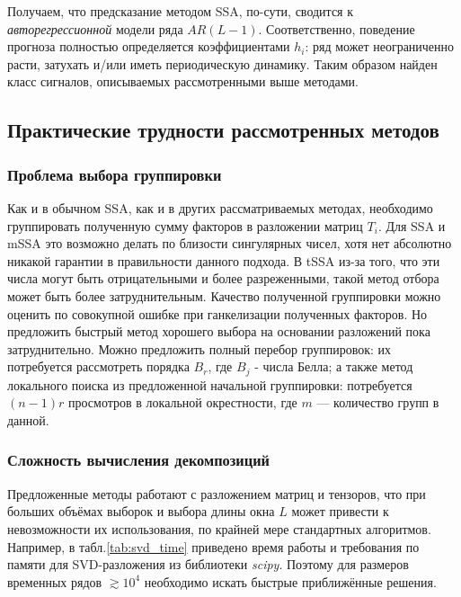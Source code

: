 			 Получаем, что предсказание методом SSA, по-сути, сводится к \textit{авторегрессионной} модели ряда $ AR(L - 1) $. Соответственно, поведение прогноза полностью определяется коэффициентами $ h_i $: ряд может неограниченно расти, затухать и/или иметь периодическую динамику. Таким образом найден класс сигналов, описываемых рассмотренными выше методами.
			 
			 
			 \subsection*{Практические трудности рассмотренных методов}
			 	
			 	\subsubsection*{Проблема выбора группировки}
			 	
			 		Как и в обычном SSA, как и в других рассматриваемых методах, необходимо группировать полученную сумму факторов в разложении матриц $ T_i $. Для SSA и mSSA это возможно делать по близости сингулярных чисел, хотя нет абсолютно никакой гарантии в правильности данного подхода. В tSSA из-за того, что эти числа могут быть отрицательными и более разреженными, такой метод отбора может быть более затруднительным. Качество полученной группировки можно оценить по совокупной ошибке при ганкелизации полученных факторов. Но предложить быстрый метод хорошего выбора на основании разложений пока затруднительно. Можно предложить полный перебор группировок: их потребуется рассмотреть порядка $ B_r $, где $ B_j $ - числа Белла; а также метод локального поиска из предложенной начальной группировки: потребуется $ (n - 1) r $ просмотров в локальной окрестности, где $ m $ --- количество групп в данной.
			 		
			 	\subsubsection*{Сложность вычисления декомпозиций}
			 	
			 		Предложенные методы работают с разложением матриц и тензоров, что при больших объёмах выборок и выбора длины окна $ L $ может привести к невозможности их использования, по крайней мере стандартных алгоритмов. Например, в табл.\ref{tab:svd_time}  приведено время работы и требования по памяти для SVD-разложения из библиотеки \textit{scipy}. Поэтому для размеров временных рядов $ \gtrsim 10^4 $ необходимо искать быстрые приближённые решения.
			 		
